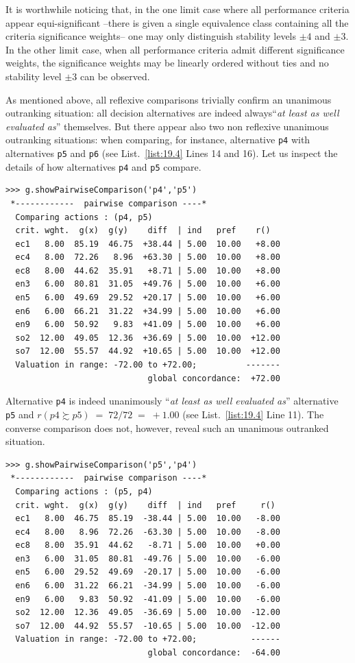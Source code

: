 It is worthwhile noticing that, in the one limit case where all performance criteria appear equi-significant --there is given a single equivalence class containing all the criteria significance weights-- one may only distinguish stability levels $\pm 4$ and $\pm 3$. In the other limit case, when all performance criteria admit different significance weights, the significance weights may be linearly ordered without ties and no stability level $\pm 3$ can be observed.

As mentioned above, all reflexive comparisons trivially confirm an unanimous outranking situation: all decision alternatives are indeed always``\emph{at least as well evaluated as}'' themselves. But there appear also two non reflexive unanimous outranking situations: when comparing, for instance, alternative \texttt{p4} with alternatives \texttt{p5} and \texttt{p6} (see List.~\vref{list:19.4} Lines 14 and 16). Let us inspect the details of how alternatives \texttt{p4} and \texttt{p5} compare.
\begin{lstlisting}
>>> g.showPairwiseComparison('p4','p5')
 *------------  pairwise comparison ----*
  Comparing actions : (p4, p5)
  crit. wght.  g(x)  g(y)    diff  | ind   pref    r()
  ec1   8.00  85.19  46.75  +38.44 | 5.00  10.00   +8.00
  ec4   8.00  72.26   8.96  +63.30 | 5.00  10.00   +8.00
  ec8   8.00  44.62  35.91   +8.71 | 5.00  10.00   +8.00
  en3   6.00  80.81  31.05  +49.76 | 5.00  10.00   +6.00
  en5   6.00  49.69  29.52  +20.17 | 5.00  10.00   +6.00
  en6   6.00  66.21  31.22  +34.99 | 5.00  10.00   +6.00
  en9   6.00  50.92   9.83  +41.09 | 5.00  10.00   +6.00
  so2  12.00  49.05  12.36  +36.69 | 5.00  10.00  +12.00
  so7  12.00  55.57  44.92  +10.65 | 5.00  10.00  +12.00
  Valuation in range: -72.00 to +72.00;          -------
                             global concordance:  +72.00
\end{lstlisting}

Alternative \texttt{p4} is indeed  unanimously ``\emph{at least as well evaluated as}'' alternative \texttt{p5} and $r(p4 \succsim p5)\; =\; 72/72\; =\; +1.00$ (see List.~\vref{list:19.4} Line 11). The converse comparison does not, however, reveal such an unanimous outranked situation. 
\begin{lstlisting}
>>> g.showPairwiseComparison('p5','p4')
 *------------  pairwise comparison ----*
  Comparing actions : (p5, p4)
  crit. wght.  g(x)  g(y)    diff  | ind   pref     r()
  ec1   8.00  46.75  85.19  -38.44 | 5.00  10.00   -8.00
  ec4   8.00   8.96  72.26  -63.30 | 5.00  10.00   -8.00
  ec8   8.00  35.91  44.62   -8.71 | 5.00  10.00   +0.00
  en3   6.00  31.05  80.81  -49.76 | 5.00  10.00   -6.00
  en5   6.00  29.52  49.69  -20.17 | 5.00  10.00   -6.00
  en6   6.00  31.22  66.21  -34.99 | 5.00  10.00   -6.00
  en9   6.00   9.83  50.92  -41.09 | 5.00  10.00   -6.00
  so2  12.00  12.36  49.05  -36.69 | 5.00  10.00  -12.00
  so7  12.00  44.92  55.57  -10.65 | 5.00  10.00  -12.00
  Valuation in range: -72.00 to +72.00;           ------
                             global concordance:  -64.00
\end{lstlisting}


